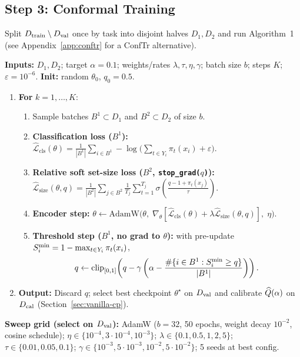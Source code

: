 \documentclass[10pt,a4paper]{article}
\newcommand{\Lcls}{\widehat{\mathcal L}_{\mathrm{cls}}}
\newcommand{\Lsize}{\widehat{\mathcal L}_{\mathrm{size}}}
\begin{document}
\subsection{Step 3: Conformal Training}
Split $D_{\mathrm{train}}\setminus D_{\mathrm{val}}$ once by task into disjoint halves $D_1, D_2$ and run Algorithm~1 (see Appendix~\ref{app:conftr} for a ConfTr alternative).

\begin{tcolorbox}[algbox,title={Algorithm 1 \textperiodcentered\ DPSM Conformal Training for Step-Embedding Encoder}]
\small
\textbf{Inputs:} $D_1, D_2$; target $\alpha=0.1$; weights/rates $\lambda, \tau, \eta, \gamma$; batch size $b$; steps $K$; $\varepsilon=10^{-6}$. \quad \textbf{Init:} random $\theta_0$, $q_0=0.5$.
\begin{enumerate}[leftmargin=1.4em,itemsep=2pt]
\item \textbf{For} $k=1,\dots,K$:
  \begin{enumerate}[label=\arabic{enumi}.\arabic*.,leftmargin=1.6em,itemsep=1.5pt]
  \item Sample batches $B^1\subset D_1$ and $B^2\subset D_2$ of size $b$.
  \item \textbf{Classification loss ($B^1$):} $\displaystyle \Lcls(\theta) = \frac{1}{|B^1|}\sum_{i\in B^1} -\log\!\Big(\sum_{t\in Y_i}\pi_t(x_i)+\varepsilon\Big)$.
  \item \textbf{Relative soft set-size loss ($B^2$, \texttt{stop\_grad($q$)}):} $\displaystyle \Lsize(\theta,q) = \frac{1}{|B^2|}\sum_{j\in B^2}\frac{1}{T_j}\sum_{t=1}^{T_j}\sigma\!\left(\frac{q - 1 + \pi_t(x_j)}{\tau}\right)$.
  \item \textbf{Encoder step:} $\theta \leftarrow \mathrm{AdamW}\big(\theta,\; \nabla_\theta[\Lcls(\theta)+\lambda\Lsize(\theta,q)],\; \eta\big)$.
  \item \textbf{Threshold step ($B^1$, no grad to $\theta$):} with pre-update $S^{\min}_i = 1 - \max_{t\in Y_i}\pi_t(x_i)$,
  \[
  q \leftarrow \mathrm{clip}_{[0,1]}\!\left(q - \gamma\left(\alpha - \frac{\#\{i\in B^1 : S^{\min}_i \ge q\}}{|B^1|}\right)\right).
  \]
  \end{enumerate}
\item \textbf{Output:} Discard $q$; select best checkpoint $\theta^\star$ on $D_{\mathrm{val}}$ and calibrate $\widehat Q(\alpha)$ on $D_{\mathrm{cal}}$ (Section~\ref{sec:vanilla-cp}).
\end{enumerate}
\end{tcolorbox}

\textbf{Sweep grid (select on $D_{\mathrm{val}}$):} AdamW ($b=32$, 50 epochs, weight decay $10^{-2}$, cosine schedule); $\eta\in\{10^{-4},3\!\cdot\!10^{-4},10^{-3}\}$; $\lambda\in\{0.1,0.5,1,2,5\}$; $\tau\in\{0.01,0.05,0.1\}$; $\gamma\in\{10^{-3},5\!\cdot\!10^{-3},10^{-2},5\!\cdot\!10^{-2}\}$; 5 seeds at best config.
\end{document}
